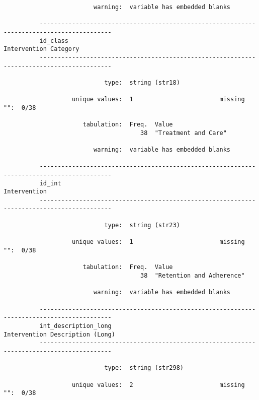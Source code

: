 \documentclass{article}
\begin{document}
\begin{verbatim}
                         warning:  variable has embedded blanks
          
          ------------------------------------------------------------------------------------------
          id_class                                                             Intervention Category
          ------------------------------------------------------------------------------------------
          
                            type:  string (str18)
          
                   unique values:  1                        missing "":  0/38
          
                      tabulation:  Freq.  Value
                                      38  "Treatment and Care"
          
                         warning:  variable has embedded blanks
          
          ------------------------------------------------------------------------------------------
          id_int                                                                        Intervention
          ------------------------------------------------------------------------------------------
          
                            type:  string (str23)
          
                   unique values:  1                        missing "":  0/38
          
                      tabulation:  Freq.  Value
                                      38  "Retention and Adherence"
          
                         warning:  variable has embedded blanks
          
          ------------------------------------------------------------------------------------------
          int_description_long                                       Intervention Description (Long)
          ------------------------------------------------------------------------------------------
          
                            type:  string (str298)
          
                   unique values:  2                        missing "":  0/38
          

\end{verbatim}
\end{document}
